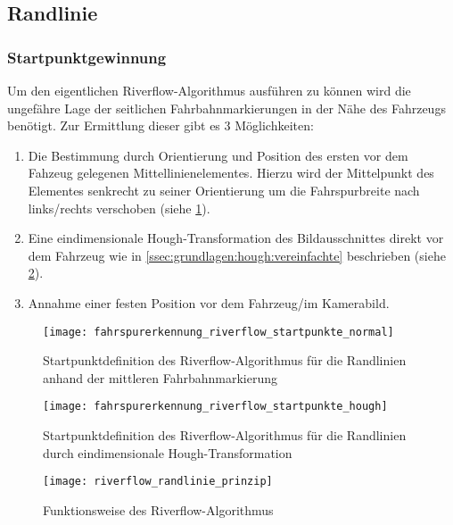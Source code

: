\subsection{Randlinie} \label{ssec:fahrspurerkennung:riverflow:randlinie}
\subsubsection{Startpunktgewinnung}
Um den eigentlichen Riverflow-Algorithmus ausführen zu können wird die ungefähre Lage der seitlichen Fahrbahnmarkierungen in der Nähe des Fahrzeugs benötigt. Zur Ermittlung dieser gibt es 3 Möglichkeiten:
\begin{enumerate}
\item \label{item:solidline:startpoints:dashedline}
Die Bestimmung durch Orientierung und Position des ersten vor dem Fahzeug gelegenen Mittellinienelementes. Hierzu wird der Mittelpunkt des Elementes senkrecht zu seiner Orientierung um die Fahrspurbreite nach links/rechts verschoben (siehe \ref{fig:riverflow:randlinien:startpoints:dashedline}).
\item \label{item:solidline:startpoints:hough}
Eine eindimensionale Hough-Transformation des Bildausschnittes direkt vor dem Fahrzeug wie in \ref{ssec:grundlagen:hough:vereinfachte} beschrieben (siehe \ref{fig:riverflow:randlinien:startpoints:hough}). 
\item \label{item:solidline:startpoints:fixed}
Annahme einer festen Position vor dem Fahrzeug/im Kamerabild.
\end{enumerate}

\begin{figure}[htb]
	\centering
	\texttt{[image: fahrspurerkennung\_riverflow\_startpunkte\_normal]}
	\caption{Startpunktdefinition des Riverflow-Algorithmus für die Randlinien anhand der mittleren Fahrbahnmarkierung}
	\label{fig:riverflow:randlinien:startpoints:dashedline}
\end{figure}

\begin{figure}[htb]
	\centering
	\texttt{[image: fahrspurerkennung\_riverflow\_startpunkte\_hough]}
	\caption{Startpunktdefinition des Riverflow-Algorithmus für die Randlinien durch eindimensionale Hough-Transformation}
	\label{fig:riverflow:randlinien:startpoints:hough}
\end{figure}

\begin{figure}[htb]
  \centering
  \texttt{[image: riverflow\_randlinie\_prinzip]}
  \caption{Funktionsweise des Riverflow-Algorithmus}
  \label{fig:riverflow:randlinie:prinzip}
\end{figure}

